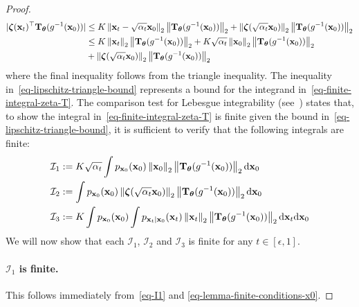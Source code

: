 \begin{proof}
\begin{equation}
\label{eq-lipschitz-triangle-bound}
\begin{aligned}
\vert\boldsymbol{\zeta}(\mathbf{x}_t)^{\top} \mathbf{T}_{\boldsymbol{\theta}}(g^{-1}(\mathbf{x}_0)) \vert &\leq K \left\lVert \mathbf{x}_t-\sqrt{\alpha_t}\mathbf{x}_0 \right\rVert_2\left\lVert \mathbf{T}_{\boldsymbol{\theta}}(g^{-1}(\mathbf{x}_0)) \right\rVert_2 + \left\lVert \boldsymbol{\zeta}(\sqrt{\alpha_t}\mathbf{x}_0) \right\rVert_2\left\lVert \mathbf{T}_{\boldsymbol{\theta}}(g^{-1}(\mathbf{x}_0)) \right\rVert_2 \\ 
&\leq K \left\lVert \mathbf{x}_t \right\rVert_2\left\lVert \mathbf{T}_{\boldsymbol{\theta}}(g^{-1}(\mathbf{x}_0)) \right\rVert_2 +  K\sqrt{\alpha_t}\left\lVert \mathbf{x}_0 \right\rVert_2\left\lVert \mathbf{T}_{\boldsymbol{\theta}}(g^{-1}(\mathbf{x}_0)) \right\rVert_2 \\ &+\left\lVert \boldsymbol{\zeta}(\sqrt{\alpha_t}\mathbf{x}_0) \right\rVert_2\left\lVert \mathbf{T}_{\boldsymbol{\theta}}(g^{-1}(\mathbf{x}_0)) \right\rVert_2
\end{aligned}
\end{equation}
where the final inequality follows from the triangle inequality. The inequality in~\eqref{eq-lipschitz-triangle-bound} represents a bound for the integrand in~\eqref{eq-finite-integral-zeta-T}.
The comparison test for Lebesgue integrability (see~\citep[Proposition 4.16]{Royden_2010}) states that, to show the integral in~\eqref{eq-finite-integral-zeta-T} is finite given the bound in~\eqref{eq-lipschitz-triangle-bound}, it is sufficient to verify that the following integrals are finite:
\begin{subequations}
\begin{align}
\mathcal{I}_{1} &:=  K\sqrt{\alpha_t}\int p_{\mathbf{x}_0}(\mathbf{x}_0) \left\lVert \mathbf{x}_0 \right\rVert_2\left\lVert \mathbf{T}_{\boldsymbol{\theta}}(g^{-1}(\mathbf{x}_0)) \right\rVert_2 \mathrm{d}\mathbf{x}_0 \label{eq-I1}\\
\mathcal{I}_{2} &:= \int p_{\mathbf{x}_0}(\mathbf{x}_0)\left\lVert \boldsymbol{\zeta}(\sqrt{\alpha_t}\mathbf{x}_0) \right\rVert_2\left\lVert \mathbf{T}_{\boldsymbol{\theta}}(g^{-1}(\mathbf{x}_0)) \right\rVert_2 \mathrm{d}\mathbf{x}_0 \label{eq-I2}\\
\mathcal{I}_{3} &:= K  \int p_{\mathbf{x}_0}(\mathbf{x}_0)\int  p_{\mathbf{x}_t|\mathbf{x}_0}(\mathbf{x}_t) \left\lVert \mathbf{x}_t \right\rVert_2\left\lVert \mathbf{T}_{\boldsymbol{\theta}}(g^{-1}(\mathbf{x}_0)) \right\rVert_2  \mathrm{d}\mathbf{x}_t \mathrm{d}\mathbf{x}_0 \label{eq-I3} 
\end{align}
\end{subequations}
We will now show that each $\mathcal{I}_{1}$, $\mathcal{I}_{2}$ and $\mathcal{I}_{3}$ is finite for any $t\in[\epsilon,1]$.
\paragraph{$\mathcal{I}_{1}$ is finite.} This follows immediately from~\eqref{eq-I1} and \eqref{eq-lemma-finite-conditions-x0}.

\end{proof}
